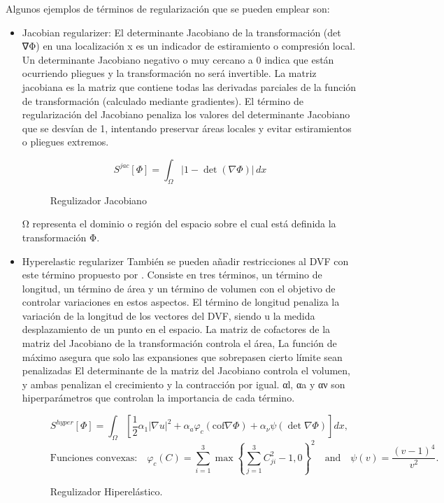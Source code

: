 Algunos ejemplos de términos de regularización que se pueden emplear son:
\begin{itemize}
    \item Jacobian regularizer: 
    El determinante Jacobiano de la transformación (det ∇Φ) en una localización x es un indicador de estiramiento o compresión local.
    Un determinante Jacobiano negativo o muy cercano a 0 indica que están ocurriendo pliegues y la transformación no será invertible.
    La matriz jacobiana es la matriz que contiene todas las derivadas parciales de la función de transformación (calculado mediante gradientes).
    El término de regularización del Jacobiano penaliza los valores del determinante Jacobiano que se desvían de 1,
    intentando preservar áreas locales y evitar estiramientos o pliegues extremos.

    \begin{figure}[tbp]
        \centering
        \[
        S^{jac}[\Phi] = \int_{\Omega} \left| 1 - \det \left( \nabla \Phi \right) \right| \, dx
        \]
        \caption{Regulizador Jacobiano}
    \end{figure}

    Ω representa el dominio o región del espacio sobre el cual está definida la transformación Φ.
    
    \item Hyperelastic regularizer
    También se pueden añadir restricciones al DVF con este término propuesto por \cite{HyperelasticRegularization}.
    Consiste en tres términos, un término de longitud, un término de área y un término de volumen con el objetivo de controlar variaciones en estos aspectos.
    El término de longitud penaliza la variación de la longitud de los vectores del DVF, siendo u la medida desplazamiento de un punto en el espacio.
    La matriz de cofactores de la matriz del Jacobiano de la transformación controla el área,
    La función de máximo asegura que solo las expansiones que sobrepasen cierto límite sean penalizadas
    El determinante de la matriz del Jacobiano controla el volumen,
    y ambas penalizan el crecimiento y la contracción por igual.
    αl, αa y αν son hiperparámetros que controlan la importancia de cada término.

    \begin{figure}[tbp]
        \centering
        \[
        S^{hyper}[\Phi] = \int_{\Omega} \left[ \frac{1}{2} \alpha_1 |\nabla u|^2 + \alpha_a \varphi_c (\text{cof} \nabla \Phi) + \alpha_\nu \psi(\det \nabla \Phi) \right] dx,
        \]
        \[
        \text{Funciones convexas:} \quad \varphi_c(C) = \sum_{i=1}^3 \max \left\{ \sum_{j=1}^3 C_{ji}^2 - 1, 0 \right\}^2 \quad \text{and} \quad \psi(v) = \frac{(v-1)^4}{v^2}.
        \]
        \caption{Regulizador Hiperelástico.}
    \end{figure}



\end{itemize}
